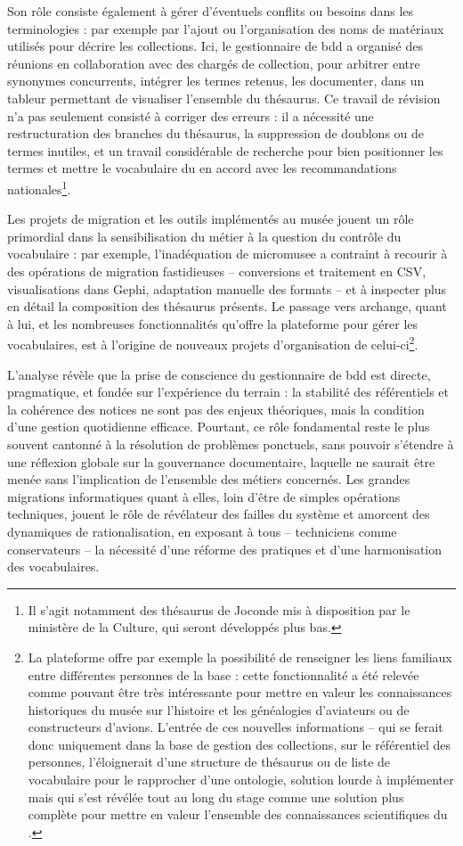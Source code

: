 Son rôle consiste également à gérer d'éventuels conflits ou besoins dans les terminologies : par exemple par l'ajout ou l'organisation des noms de matériaux utilisés pour décrire les collections. Ici, le gestionnaire de \gls{bdd} a organisé des réunions en collaboration avec des chargés de collection, pour arbitrer entre synonymes concurrents, intégrer les termes retenus, les documenter, dans un tableur permettant de visualiser l'ensemble du thésaurus. Ce travail de révision n’a pas seulement consisté à corriger des erreurs : il a nécessité une restructuration des branches du thésaurus, la suppression de doublons ou de termes inutiles, et un travail considérable de recherche pour bien positionner les termes et mettre le vocabulaire du \mae en accord avec les recommandations nationales\footnote{Il s'agit notamment des thésaurus de Joconde mis à disposition par le ministère de la Culture, qui seront développés plus bas.}.

Les projets de migration et les outils implémentés au musée jouent un rôle primordial dans la sensibilisation du métier à la question du contrôle du vocabulaire : par exemple, l’inadéquation de \gls{micromusee} a contraint à recourir à des opérations de migration fastidieuses -- conversions et traitement en CSV, visualisations dans Gephi, adaptation manuelle des formats -- et à inspecter plus en détail la composition des thésaurus présents. Le passage vers \gls{archange}, quant à lui, et les nombreuses fonctionnalités qu'offre la plateforme pour gérer les vocabulaires, est à l'origine de nouveaux projets d'organisation de celui-ci\footnote{La plateforme offre par exemple la possibilité de renseigner les liens familiaux entre différentes personnes de la base : cette fonctionnalité a été relevée comme pouvant être très intéressante pour mettre en valeur les connaissances historiques du musée sur l'histoire et les généalogies d'aviateurs ou de constructeurs d'avions. L'entrée de ces nouvelles informations -- qui se ferait donc uniquement dans la base de gestion des collections, sur le référentiel des personnes, l'éloignerait d'une structure de thésaurus ou de liste de vocabulaire pour le rapprocher d'une ontologie, solution lourde à implémenter mais qui s'est révélée tout au long du stage comme une solution plus complète pour mettre en valeur l'ensemble des connaissances scientifiques du \mae.}.

L’analyse révèle que la prise de conscience du gestionnaire de \gls{bdd} est directe, pragmatique, et fondée sur l’expérience du terrain : la stabilité des référentiels et la cohérence des notices ne sont pas des enjeux théoriques, mais la condition d’une gestion quotidienne efficace. Pourtant, ce rôle fondamental reste le plus souvent cantonné à la résolution de problèmes ponctuels, sans pouvoir s’étendre à une réflexion globale sur la gouvernance documentaire, laquelle ne saurait être menée sans l’implication de l’ensemble des métiers concernés. Les grandes migrations informatiques quant à elles, loin d’être de simples opérations techniques, jouent le rôle de révélateur des failles du système et amorcent des dynamiques de rationalisation, en exposant à tous -- techniciens comme conservateurs -- la nécessité d’une réforme des pratiques et d’une harmonisation des vocabulaires.

